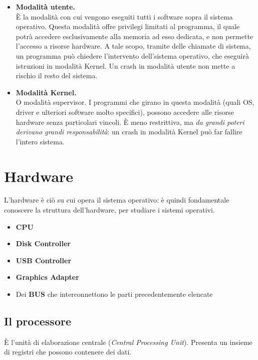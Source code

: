 \documentclass{report}
\begin{document}
\begin{itemize}
    \item \textbf{Modalità utente.}\\
    È la modalità con cui vengono eseguiti tutti i software sopra il sistema operativo. Questa modalità offre privilegi limitati al programma, il quale potrà accedere esclusivamente alla memoria ad esso dedicata, e non permette l'accesso a risorse hardware. A tale scopo, tramite delle chiamate di sistema, un programma può chiedere l'intervento dell'sistema operativo, che eseguirà istruzioni in modalità Kernel. Un crash in modalità utente non mette a rischio il resto del sistema.
    \item \textbf{Modalità Kernel.}\\
    O modalità supervisor. I programmi che girano in questa modalità (quali OS, driver e ulteriori software molto specifici), possono accedere alle risorse hardware senza particolari vincoli. È meno restrittiva, ma \textit{da grandi poteri derivano grandi responsabilità}: un crash in modalità Kernel può far fallire l'intero sistema.
\end{itemize}

\newpage

\section{Hardware}
L'hardware è ciò su cui opera il sistema operativo: è quindi fondamentale conoscere la struttura dell'hardware, per studiare i sistemi operativi.

\begin{itemize}
    \item \textbf{CPU}
    \item \textbf{Disk Controller}
    \item \textbf{USB Controller}
    \item \textbf{Graphics Adapter}
    \item Dei \textbf{BUS} che interconnettono le parti precedentemente elencate
\end{itemize}

\subsection{Il processore}
È l'unità di elaborazione centrale (\textit{Central Processing Unit}). Presenta un insieme di registri che possono contenere dei dati. 
\end{document}
